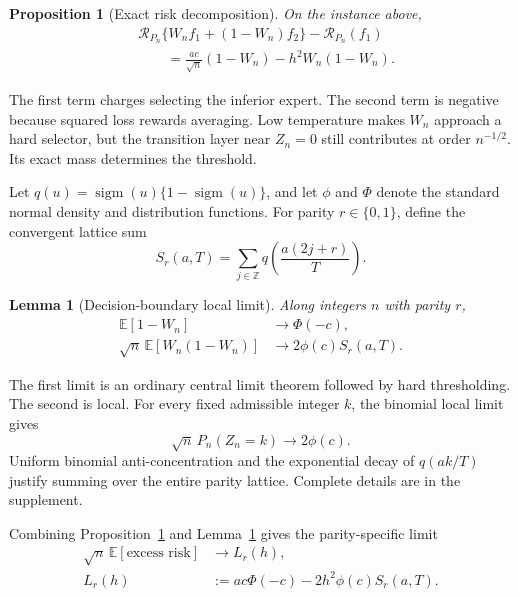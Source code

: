 \documentclass[twoside]{article}
\newtheorem{proposition}[theorem]{Proposition}
\newtheorem{lemma}[theorem]{Lemma}
\newcommand{\E}{\mathbb E}
\newcommand{\R}{\mathcal R}
\newcommand{\1}{\mathbf 1}
\newcommand{\sigm}{\operatorname{sigm}}
\begin{document}
\begin{proposition}[Exact risk decomposition]
\label{prop:risk}
On the instance above,
\begin{align}
&\R_{P_n}\{W_nf_1+(1-W_n)f_2\}-\R_{P_n}(f_1)\nonumber\\
&\qquad=\frac{ac}{\sqrt n}(1-W_n)-h^2W_n(1-W_n).
\label{eq:decomp}
\end{align}
\end{proposition}

The first term charges selecting the inferior expert. The second term is negative because squared loss rewards averaging. Low temperature makes $W_n$ approach a hard selector, but the transition layer near $Z_n=0$ still contributes at order $n^{-1/2}$. Its exact mass determines the threshold.

Let $q(u)=\sigm(u)\{1-\sigm(u)\}$, and let $\phi$ and $\Phi$ denote the standard normal density and distribution functions. For parity $r\in\{0,1\}$, define the convergent lattice sum
\begin{equation}
S_r(a,T)=\sum_{j\in\mathbb Z}q\left(\frac{a(2j+r)}{T}\right).
\label{eq:lattice}
\end{equation}

\begin{lemma}[Decision-boundary local limit]
\label{lem:local}
Along integers $n$ with parity $r$,
\begin{align}
\E[1-W_n]&\longrightarrow\Phi(-c),
\label{eq:hardlimit}\\
\sqrt n\,\E[W_n(1-W_n)]&\longrightarrow2\phi(c)S_r(a,T).
\label{eq:softlimit}
\end{align}
\end{lemma}

The first limit is an ordinary central limit theorem followed by hard thresholding. The second is local. For every fixed admissible integer $k$, the binomial local limit gives \[ \sqrt n\,P_n(Z_n=k)\longrightarrow2\phi(c). \] Uniform binomial anti-concentration and the exponential decay of $q(ak/T)$ justify summing over the entire parity lattice. Complete details are in the supplement.

Combining Proposition~\ref{prop:risk} and Lemma~\ref{lem:local} gives the parity-specific limit
\begin{align}
\sqrt n\,\E[\text{excess risk}]
&\longrightarrow L_r(h),\nonumber\\
L_r(h)&:=ac\Phi(-c)-2h^2\phi(c)S_r(a,T).
\label{eq:limitcoefficient}
\end{align}
\end{document}
